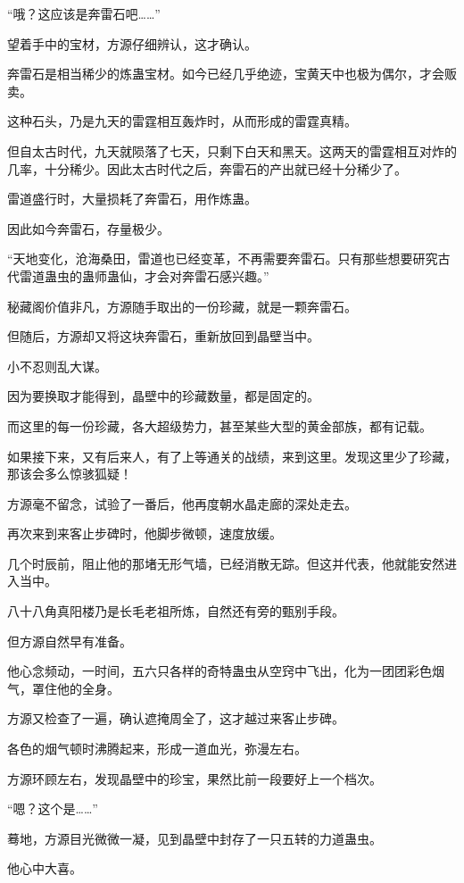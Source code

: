 \begin{this_body}
“哦？这应该是奔雷石吧……”

望着手中的宝材，方源仔细辨认，这才确认。

奔雷石是相当稀少的炼蛊宝材。如今已经几乎绝迹，宝黄天中也极为偶尔，才会贩卖。

这种石头，乃是九天的雷霆相互轰炸时，从而形成的雷霆真精。

但自太古时代，九天就陨落了七天，只剩下白天和黑天。这两天的雷霆相互对炸的几率，十分稀少。因此太古时代之后，奔雷石的产出就已经十分稀少了。

雷道盛行时，大量损耗了奔雷石，用作炼蛊。

因此如今奔雷石，存量极少。

“天地变化，沧海桑田，雷道也已经变革，不再需要奔雷石。只有那些想要研究古代雷道蛊虫的蛊师蛊仙，才会对奔雷石感兴趣。”

秘藏阁价值非凡，方源随手取出的一份珍藏，就是一颗奔雷石。

但随后，方源却又将这块奔雷石，重新放回到晶壁当中。

小不忍则乱大谋。

因为要换取才能得到，晶壁中的珍藏数量，都是固定的。

而这里的每一份珍藏，各大超级势力，甚至某些大型的黄金部族，都有记载。

如果接下来，又有后来人，有了上等通关的战绩，来到这里。发现这里少了珍藏，那该会多么惊骇狐疑！

方源毫不留念，试验了一番后，他再度朝水晶走廊的深处走去。

再次来到来客止步碑时，他脚步微顿，速度放缓。

几个时辰前，阻止他的那堵无形气墙，已经消散无踪。但这并代表，他就能安然进入当中。

八十八角真阳楼乃是长毛老祖所炼，自然还有旁的甄别手段。

但方源自然早有准备。

他心念频动，一时间，五六只各样的奇特蛊虫从空窍中飞出，化为一团团彩色烟气，罩住他的全身。

方源又检查了一遍，确认遮掩周全了，这才越过来客止步碑。

各色的烟气顿时沸腾起来，形成一道血光，弥漫左右。

方源环顾左右，发现晶壁中的珍宝，果然比前一段要好上一个档次。

“嗯？这个是……”

蓦地，方源目光微微一凝，见到晶壁中封存了一只五转的力道蛊虫。

他心中大喜。

\end{this_body}

